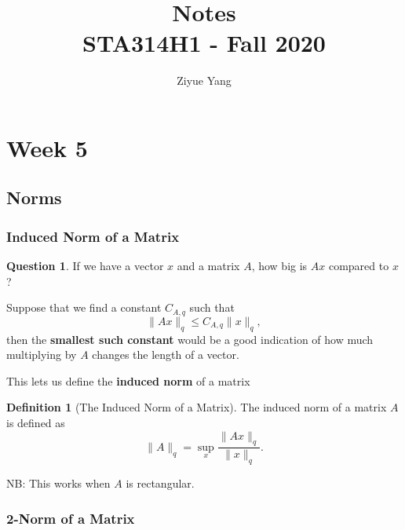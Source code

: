 \documentclass[11pt]{article}
\title{Notes\\
  {\large STA314H1 - Fall 2020}}
\author{Ziyue Yang}
\theoremstyle{definition}
\newtheorem{definition}{Definition}[section]
\newtheorem{question}{Question}[section]
\numberwithin{equation}{section}
\begin{document}
\maketitle

\tableofcontents

\newpage

\section{Week 5}

\subsection{Norms}

\subsubsection{Induced Norm of a Matrix}

\begin{question}
  If we have a vector $x$ and a matrix $A$, how big is $Ax$ compared to $x$?

  Suppose that we find a constant $C_{A, q}$ such that
  \begin{equation}
    \| Ax\|_q \leq C_{A, q}\|x\|_q,
  \end{equation}
  then the \textbf{smallest such constant} would be a good indication of how much multiplying by $A$ changes the length of a vector.
\end{question}
\begin{writenotes}
  This lets us define the \textbf{induced norm} of a matrix
\end{writenotes}

\begin{definition}[The Induced Norm of a Matrix]
The induced norm of a matrix $A$ is defined as
  \begin{equation}
    \|A\|_q = \sup_x\frac{\|Ax\|_q}{\|x\|_q}.
  \end{equation}
\end{definition}

\begin{writenotes}
  NB: This works when $A$ is rectangular.
\end{writenotes}

\subsubsection{2-Norm of a Matrix}
\end{document}
